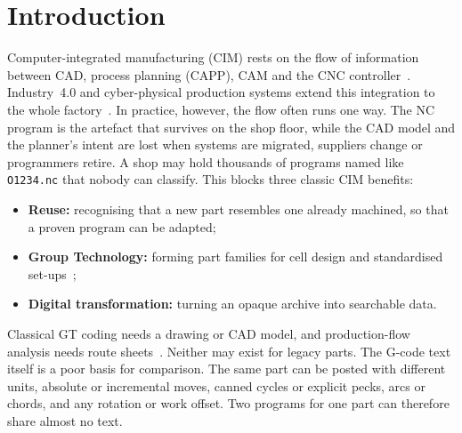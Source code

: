 \documentclass[conference]{IEEEtran}
\begin{document}
\section{Introduction}
Computer-integrated manufacturing (CIM) rests on the flow of information
between CAD, process planning (CAPP), CAM and the CNC controller~\cite{groover2019,xu2009,xu2004}.
Industry~4.0 and cyber-physical production systems extend this integration to
the whole factory~\cite{lee2015,lu2017}. In practice, however, the flow often runs one way. The NC program is the artefact that
survives on the shop floor, while the CAD model and the planner's intent are
lost when systems are migrated, suppliers change or programmers retire. A shop
may hold thousands of programs named like \texttt{O1234.nc} that nobody can
classify. This blocks three classic CIM benefits:
\begin{itemize}
\item \textbf{Reuse:} recognising that a new part resembles one already
machined, so that a proven program can be adapted;
\item \textbf{Group Technology:} forming part families for cell design and
standardised set-ups~\cite{opitz1970,burbidge1989};
\item \textbf{Digital transformation:} turning an opaque archive into searchable data.
\end{itemize}

Classical GT coding needs a drawing or CAD model, and production-flow analysis
needs route sheets~\cite{burbidge1989}. Neither may exist for legacy parts.
The G-code text itself is a poor basis for comparison. The same part can be
posted with different units, absolute or incremental moves, canned cycles or
explicit pecks, arcs or chords, and any rotation or work offset. Two programs
for one part can therefore share almost no text.
\end{document}
